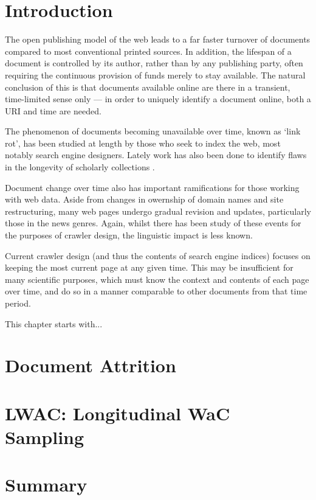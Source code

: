 
\section{Introduction}
\label{sec:longitudinal:introduction}
The open publishing model of the web leads to a far faster turnover of documents compared to most conventional printed sources.  In addition, the lifespan of a document is controlled by its author, rather than by any publishing party, often requiring the continuous provision of funds merely to stay available.  The natural conclusion of this is that documents available online are there in a transient, time-limited sense only --- in order to uniquely identify a document online, both a URI and time are needed.

The phenomenon of documents becoming unavailable over time, known as `link rot', has been studied at length by those who seek to index the web, most notably search engine designers.  Lately work has also been done to identify flaws in the longevity of scholarly collections .

Document change over time also has important ramifications for those working with web data.  Aside from changes in owernship of domain names and site restructuring, many web pages undergo gradual revision and updates, particularly those in the news genres.  Again, whilst there has been study of these events for the purposes of crawler design, the linguistic impact is less known.

Current crawler design (and thus the contents of search engine indices) focuses on keeping the most current page at any given time.  This may be insufficient for many scientific purposes, which must know the context and contents of each page over time, and do so in a manner comparable to other documents from that time period.

This chapter starts with...


\section{Document Attrition}
\label{sec:longitudinal:attrition}




\section{LWAC: Longitudinal WaC Sampling}
\label{sec:longitudinal:lwac}





\section{Summary}
\label{sec:longitudinal:summary}



